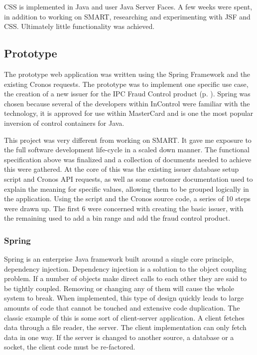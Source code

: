 \documentclass[a4paper, 11pt, titlepage]{article}
\begin{document}
CSS is implemented in Java and user Java Server Faces. A few weeks were spent, in addition to working on SMART, researching and experimenting with JSF and CSS. Ultimately little functionality was achieved.
 
\subsection{Prototype} 
 
The prototype web application was written using the Spring Framework \cite{Spring} and the existing Cronos requests. The prototype was to implement one specific use case, the creation of a new issuer for the IPC Fraud Control product  (p. \pageref{fraud_control}).
Spring was chosen because several of the developers within InControl were familiar with the technology, it is approved for use within MasterCard and is one the most popular inversion of control containers for Java. 

This project was very different from working on SMART. It gave me exposure to the full software development life-cycle in a scaled down manner. The functional specification above was finalized and a collection of documents needed to achieve this were gathered. At the core of this was the existing issuer database setup script and Cronos API requests, as well as some customer documentation used to explain the meaning for specific values, allowing them to be grouped logically in the application. 
Using the script and the Cronos source code, a series of 10 steps were drawn up. The first 6 were concerned with creating the basic issuer, with the remaining used to add a bin range and add the fraud control product. 
 
\subsubsection{Spring} 
 
Spring is an enterprise Java framework built around a single core principle, dependency injection. Dependency injection is a solution to the object coupling problem. If a number of objects make direct calls to each other they are said to be tightly coupled. Removing or changing any of them will cause the whole system to break. When implemented, this type of design quickly leads to large amounts of code that cannot be touched and extensive code duplication. The classic example of this is some sort of client-server application. A client fetches data through a file reader, the server. The client implementation can only fetch data in one way. If the server is changed to another source, a database or a socket, the client code must be re-factored.  
 
\end{document}
